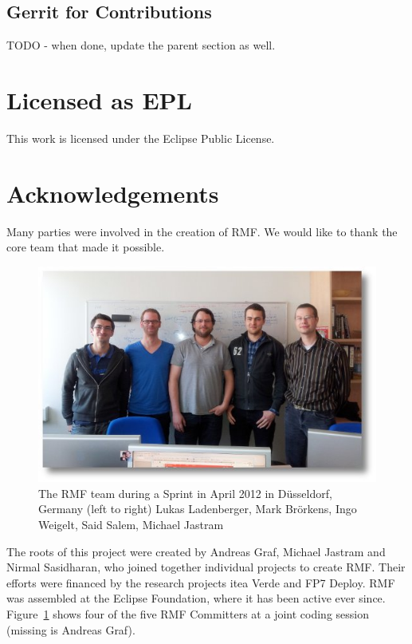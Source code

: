 \subsection{Gerrit for Contributions}

TODO - when done, update the parent section as well.

\section{Licensed as EPL}

This work is licensed under the Eclipse Public License.

\section{Acknowledgements}

Many parties were involved in the creation of RMF.  We would like to thank the core team that made it possible.

\begin{figure}[H]
  \centering
  \includegraphics[width=\textwidth]{../rmf-images/2012_03_sprint_team.jpg}
  \caption{The RMF team during a Sprint in April 2012 in Düsseldorf, Germany
  (left to right) Lukas Ladenberger, Mark Brörkens, Ingo Weigelt, Said Salem, Michael Jastram}
  \label{fig:intro_core_team}
\end{figure}


The roots of this project were created by Andreas Graf, Michael Jastram and Nirmal Sasidharan, who joined together individual projects to create RMF.  Their efforts were financed by the research projects itea Verde and FP7 Deploy.  RMF was assembled at the Eclipse Foundation, where it has been active ever since.  Figure~\ref{fig:intro_core_team} shows four of the five RMF Committers at a joint coding session (missing is Andreas Graf).
